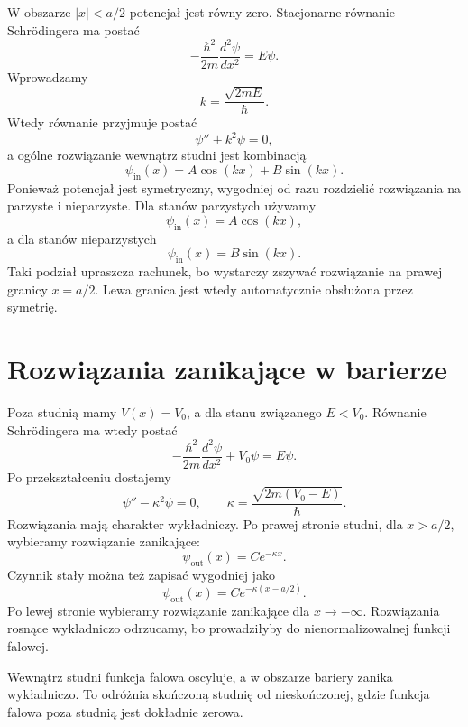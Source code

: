 W obszarze \(|x|<a/2\) potencjał jest równy zero. Stacjonarne równanie Schrödingera ma postać
\begin{equation}
    -\frac{\hbar^2}{2m}\frac{d^2\psi}{dx^2}=E\psi.
\end{equation}
Wprowadzamy
\begin{equation}
    k=\frac{\sqrt{2mE}}{\hbar}.
\end{equation}
Wtedy równanie przyjmuje postać
\[
    \psi''+k^2\psi=0,
\]
a ogólne rozwiązanie wewnątrz studni jest kombinacją
\begin{equation}
    \psi_{\mathrm{in}}(x)=A\cos(kx)+B\sin(kx).
\end{equation}
Ponieważ potencjał jest symetryczny, wygodniej od razu rozdzielić rozwiązania na parzyste i nieparzyste. Dla stanów parzystych używamy
\[
    \psi_{\mathrm{in}}(x)=A\cos(kx),
\]
a dla stanów nieparzystych
\[
    \psi_{\mathrm{in}}(x)=B\sin(kx).
\]
Taki podział upraszcza rachunek, bo wystarczy zszywać rozwiązanie na prawej granicy \(x=a/2\). Lewa granica jest wtedy automatycznie obsłużona przez symetrię.

\section{Rozwiązania zanikające w barierze}

Poza studnią mamy \(V(x)=V_0\), a dla stanu związanego \(E<V_0\). Równanie Schrödingera ma wtedy postać
\begin{equation}
    -\frac{\hbar^2}{2m}\frac{d^2\psi}{dx^2}+V_0\psi=E\psi.
\end{equation}
Po przekształceniu dostajemy
\begin{equation}
    \psi''-\kappa^2\psi=0,
    \qquad
    \kappa=\frac{\sqrt{2m(V_0-E)}}{\hbar}.
\end{equation}
Rozwiązania mają charakter wykładniczy. Po prawej stronie studni, dla \(x>a/2\), wybieramy rozwiązanie zanikające:
\begin{equation}
    \psi_{\mathrm{out}}(x)=C e^{-\kappa x}.
\end{equation}
Czynnik stały można też zapisać wygodniej jako
\[
    \psi_{\mathrm{out}}(x)=C e^{-\kappa(x-a/2)}.
\]
Po lewej stronie wybieramy rozwiązanie zanikające dla \(x\to -\infty\). Rozwiązania rosnące wykładniczo odrzucamy, bo prowadziłyby do nienormalizowalnej funkcji falowej.

\begin{summarybox}
Wewnątrz studni funkcja falowa oscyluje, a w obszarze bariery zanika wykładniczo. To odróżnia skończoną studnię od nieskończonej, gdzie funkcja falowa poza studnią jest dokładnie zerowa.
\end{summarybox}

